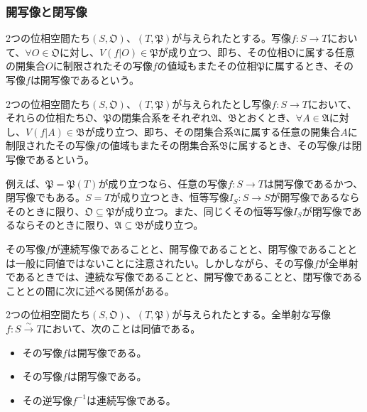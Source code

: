 \documentclass[dvipdfmx]{jsarticle}
\begin{document}
\subsubsection{開写像と閉写像}%
\begin{dfn}
2つの位相空間たち$\left( S,\mathfrak{O} \right)$、$\left( T,\mathfrak{P} \right)$が与えられたとする。写像$f:S \rightarrow T$において、$\forall O \in \mathfrak{O}$に対し、$V\left( f|O \right) \in \mathfrak{P}$が成り立つ、即ち、その位相$\mathfrak{O}$に属する任意の開集合$O$に制限されたその写像$f$の値域もまたその位相$\mathfrak{P}$に属するとき、その写像$f$は開写像であるという。
\end{dfn}
\begin{dfn}
2つの位相空間たち$\left( S,\mathfrak{O} \right)$、$\left( T,\mathfrak{P} \right)$が与えられたとし写像$f:S \rightarrow T$において、それらの位相たち$\mathfrak{O}$、$\mathfrak{P}$の閉集合系をそれぞれ$\mathfrak{A}$、$\mathfrak{B}$とおくとき、$\forall A \in \mathfrak{A}$に対し、$V\left( f|A \right) \in \mathfrak{B}$が成り立つ、即ち、その閉集合系$\mathfrak{A}$に属する任意の開集合$A$に制限されたその写像$f$の値域もまたその閉集合系$\mathfrak{B}$に属するとき、その写像$f$は閉写像であるという。
\end{dfn}\par
例えば、$\mathfrak{P} = \mathfrak{P}(T)$が成り立つなら、任意の写像$f:S \rightarrow T$は開写像であるかつ、閉写像でもある。$S = T$が成り立つとき、恒等写像$I_{S}:S \rightarrow S$が開写像であるならそのときに限り、$\mathfrak{O} \subseteq \mathfrak{P}$が成り立つ。また、同じくその恒等写像$I_{S}$が閉写像であるならそのときに限り、$\mathfrak{A} \subseteq \mathfrak{B}$が成り立つ。\par
その写像$f$が連続写像であることと、開写像であることと、閉写像であることとは一般に同値ではないことに注意されたい。しかしながら、その写像$f$が全単射であるときでは、連続な写像であることと、開写像であることと、閉写像であることとの間に次に述べる関係がある。
\begin{thm}\label{8.1.3.5}
2つの位相空間たち$\left( S,\mathfrak{O} \right)$、$\left( T,\mathfrak{P} \right)$が与えられたとする。全単射な写像$f:S\overset{\sim}{\rightarrow}T$において、次のことは同値である。
\begin{itemize}
\item
  その写像$f$は開写像である。
\item
  その写像$f$は閉写像である。
\item
  その逆写像$f^{- 1}$は連続写像である。
\end{itemize}
\end{thm}
\end{document}
